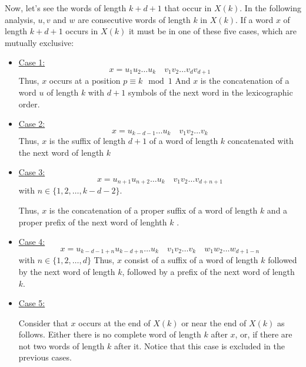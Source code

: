\documentclass[11pt,a4paper]{tesis}
\begin{document}
Now, let's see  the words of length $k + d + 1$ that occur in $X(k)$. %
In the following analysis, $u, v$ and $w$ are consecutive words of length $k$ in $X(k)$.
If a  word $x$  of length $k + d + 1$  occurs in $X(k)$ it must be in one of these five cases, which are mutually exclusive:

\begin{itemize}
  \item \underline{Case 1:} 
  $$x = u_1 u_2 \dots u_k \quad v_1 v_2 \dots v_{d} v_{d + 1}$$
    Thus, $x$ occurs at a position $p\equiv k \mod 1$ 
    And $x$ is the concatenation of a word $u$ of length $k$ with $d+1$ symbols of the next word in the lexicographic order.

  \item \underline{Case 2:} 
  $$ x = u_{k-d-1} \dots u_k \quad v_1 v_2 \dots v_k$$
  Thus, $x$ is  the suffix of length $d + 1$ of a word of length $k$  concatenated with  the next word of length $k$

  \item \underline{Case 3:} 
  $$x = u_{n+1} u_{n+2} \dots u_k \quad  v_1 v_2 \dots v_{d+n+1} $$
with $n \in \{1,2,\dots ,k - d - 2\}$.

Thus, $x$ is the concatenation of a proper suffix of a word of length $k$ and a proper prefix of the next word of lenghth $k$ .

  
  \item \underline{Case 4:} 
  $$ x = u_{k-d-1+n} u_{k-d+n} \dots u_k \quad v_1 v_2 \dots v_k \quad w_1 w_2 \dots w_{d+1-n}$$
  with $n \in \{1, 2, \dots , d\}$
Thus, $x$ consist of a suffix of a word of length $k$ followed by the next  word of length $k$,
 followed by a prefix of  the next  word of length $k$.

  \item \underline{Case 5:} 
  
Consider that    $x$ occurs at the end of $X(k)$ or near the end of   $X(k)$ as follows. Either there is no complete word of length $k$ after $x$, 
or, if there are not two words of length $k$ after it. Notice that this case is excluded in  the previous cases.

  \end{itemize}
\end{document}
